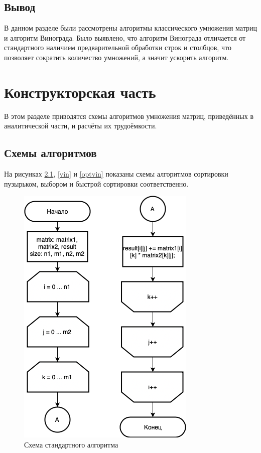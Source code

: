 \documentclass[12pt]{report}
\begin{document}
\section{Вывод}

В данном разделе были рассмотрены алгоритмы классического умножения матриц и алгоритм Винограда. Было выявлено, что алгоритм Винограда отличается от стандартного наличием предварительной обработки строк и столбцов, что позволяет сократить количество умножений, а значит ускорить алгоритм.
	
\newpage

\chapter{Конструкторская часть}

В этом разделе приводятся схемы алгоритмов умножения матриц, приведённых в аналитической части, и расчёты их трудоёмкости. 

\section{Схемы алгоритмов}

На рисунках \ref{std}, \ref{vin} и \ref{optvin} показаны схемы алгоритмов сортировки пузырьком, выбором и быстрой сортировки соответственно.

\begin{figure}[H]
	\centering
	\includegraphics[scale = 0.75]{base.drawio.png}
	\caption{Схема стандартного алгоритма}
	\label{std}
\end{figure}
\end{document}
